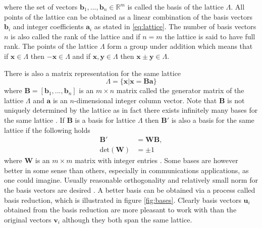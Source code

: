\documentclass[english,12pt,a4paper,pdftex,sci,utf8]{aaltothesis}
\begin{document}
\noindent where the set of vectors $\mathbf{b}_1, ... , \mathbf{b}_n \in \mathbb{R}^m$ is called the basis of the lattice $\Lambda$. All points of the lattice can be obtained as a linear combination of the basis vectors $\mathbf{b}_i$ and integer coefficients $\mathbf{a}_i$ as stated in \eqref{eq:lattice}. The number of basis vectors $n$ is also called the rank of the lattice and if $n = m$ the lattice is said to have full rank. The points of the lattice $\Lambda$ form a group under addition which means that if $\mathbf{x} \in \Lambda$ then $-\mathbf{x} \in \Lambda$ and if $\mathbf{x}, \mathbf{y} \in \Lambda$ then $\mathbf{x} \pm \mathbf{y} \in \Lambda$. \cite{cassels}
\par There is also a matrix representation for the same lattice
\begin{equation}
\Lambda = \{\mathbf{x}|\mathbf{x} = \mathbf{B}\mathbf{a} \} \label{eq:matrix}
\end{equation}
where $\mathbf{B} = [\mathbf{b}_1, ... , \mathbf{b}_n]$ is an $m \times n$ matrix called the generator matrix of the lattice $\Lambda$ and $\mathbf{a}$ is an $n$-dimensional integer column vector. Note that $\mathbf{B}$ is not uniquely determined by the lattice as in fact there exists infinitely many bases for the same lattice \cite{cassels}. If $\mathbf{B}$ is a basis for lattice $\Lambda$ then $\mathbf{B}'$ is also a basis for the same lattice if the following holds
\begin{align}
\mathbf{B}' &= \mathbf{W}\mathbf{B}, \\
\text{det}(\mathbf{W}) &= \pm 1
\label{eq:basis_change}
\end{align}
where $\mathbf{W}$ is an $m \times m$ matrix with integer entries \cite{agrell}. Some bases are however better in some sense than others, especially in communications applications, as one could imagine. Usually reasonable orthogonality and relatively small norm for the basis vectors are desired \cite{agrell}. A better basis can be obtained via a process called basis reduction, which is illustrated in figure \ref{fig:bases}. Clearly basis vectors $\mathbf{u}_i$ obtained from the basis reduction are more pleasant to work with than the original vectors $\mathbf{v}_i$ although they both span the same lattice.
\end{document}

